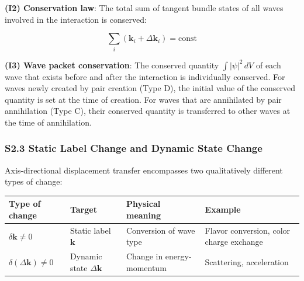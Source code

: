 \documentclass[
  a4paper,11pt]{article}
\newcounter{none}
\theoremstyle{definition}
\theoremstyle{remark}
\begin{document}
\textbf{(I2) Conservation law}: The total sum of tangent bundle states
of all waves involved in the interaction is conserved:

\[\sum_i (\mathbf{k}_i + \Delta\mathbf{k}_i) = \text{const}\]

\textbf{(I3) Wave packet conservation}: The conserved quantity
\(\int |\psi|^2 \, dV\) of each wave that exists before and after the
interaction is individually conserved. For waves newly created by pair
creation (Type D), the initial value of the conserved quantity is set at
the time of creation. For waves that are annihilated by pair
annihilation (Type C), their conserved quantity is transferred to other
waves at the time of annihilation.

\subsubsection{S2.3 Static Label Change and Dynamic State
Change}\label{s2.3-static-label-change-and-dynamic-state-change}

Axis-directional displacement transfer encompasses two qualitatively
different types of change:

{\def\LTcaptype{none} %
\begin{longtable}[]{@{}
  >{\raggedright\arraybackslash}p{}
  >{\raggedright\arraybackslash}p{}
  >{\raggedright\arraybackslash}p{}
  >{\raggedright\arraybackslash}p{}@{}}
\toprule\noalign{}
\begin{minipage}[b]{\linewidth}\raggedright
Type of change
\end{minipage} & \begin{minipage}[b]{\linewidth}\raggedright
Target
\end{minipage} & \begin{minipage}[b]{\linewidth}\raggedright
Physical meaning
\end{minipage} & \begin{minipage}[b]{\linewidth}\raggedright
Example
\end{minipage} \\
\midrule\noalign{}
\endhead
\bottomrule\noalign{}
\endlastfoot
\(\delta\mathbf{k} \neq 0\) & Static label \(\mathbf{k}\) & Conversion
of wave type & Flavor conversion, color charge exchange \\
\(\delta(\Delta\mathbf{k}) \neq 0\) & Dynamic state \(\Delta\mathbf{k}\)
& Change in energy-momentum & Scattering, acceleration \\
\end{longtable}
}
\end{document}
